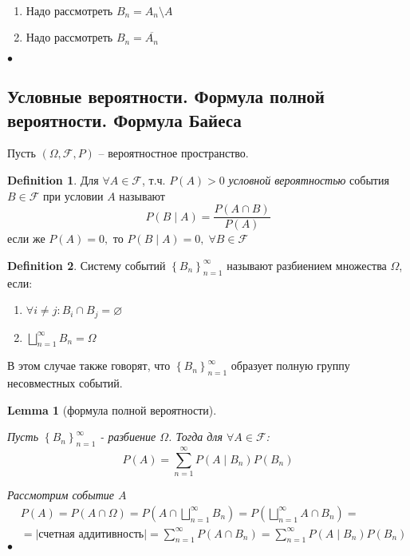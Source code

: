 \documentclass[a4paper]{article}
\theoremstyle{plain}
\newtheorem{lem}{Lemma}
\theoremstyle{remark}
\theoremstyle{definition}
\newtheorem{definition}{Definition}
\renewenvironment{proof}{{\bfseries Proof}}{$\bullet$}
\newcommand{\pars}[1]{\left( #1 \right)}
\newcommand{\setF}{\mathcal{F}}
\newcommand{\walls}[1]{\left | #1 \right |} %
\newcommand{\braces}[1]{\left\{ #1 \right\}} %
\newcommand{\expl}[1]{\walls{\text{#1}}} %
\newcommand{\comp}[1]{\overline{#1}} %
\renewcommand{\emptyset}{\varnothing}
\begin{document}
\begin{proof}~
	\begin{enumerate}
		\item Надо рассмотреть $B_n = A_n \setminus A$
		\item Надо рассмотреть $B_n = \comp{A_n}$
	\end{enumerate}
\end{proof}

\subsection{Условные вероятности. Формула полной вероятности. Формула Байеса}

Пусть $(\Omega, \setF, P)$ -- вероятностное пространство.

\begin{definition}
	Для $\forall A \in \setF$, т.ч. $P(A) > 0$
	\emph{условной вероятностью} события $B \in \setF$ при условии $A$ называют
	\begin{equation*}
		P(B \mid A) = \frac{P(A \cap B)}{P(A)}
	\end{equation*}
	если же $P(A) = 0,$ то $P(B \mid A) = 0,\; \forall B \in \setF$
\end{definition}

\begin{definition}
	Систему событий $\braces{B_n}_{n = 1}^{\infty}$ называют разбиением множества $\Omega$, если:
	\begin{enumerate}
		\item $\forall i \neq j : B_i \cap B_j = \emptyset$
		\item $\bigsqcup\limits_{n = 1}^{\infty} B_n = \Omega$ 
	\end{enumerate}
	
	В этом случае также говорят, что $\braces{B_n}_{n = 1}^{\infty}$ образует полную группу несовместных событий.
\end{definition}

\begin{lem}[формула полной вероятности]~

	Пусть $\braces{B_n}_{n = 1}^{\infty}$ - разбиение $\Omega$. Тогда для $\forall A \in \setF$:
	\begin{equation*}
		P(A) = \sum_{n = 1}^{\infty} P(A \mid B_n) P(B_n)
	\end{equation*}

	\begin{proof}
		Рассмотрим событие $A$
		\begin{align*}
			&P(A) = P(A \cap \Omega) = P\pars{A \cap \bigsqcup_{n = 1}^{\infty} B_n} =
			P\pars{\bigsqcup_{n = 1}^{\infty} A \cap B_n} = \\
			&= \expl{счетная аддитивность} = \sum_{n = 1}^{\infty} P(A \cap B_n) = 
			\sum_{n = 1}^{\infty} P(A \mid B_n) P(B_n)
		\end{align*}
	\end{proof}
\end{lem}
\end{document}
